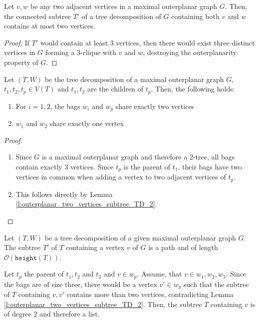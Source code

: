 \begin{lemma}\label{l:outerplanar_two_vertices_subtree_TD_2}
	Let $v,w$ be any two adjacent vertices in a maximal outerplanar graph $G$. Then, the connected subtree $T'$ of a tree decomposition of $G$ containing both $v$ and $w$ contains at most two vertices.
\end{lemma}
\begin{proof}
	If $T'$ would contain at least 3 vertices, then there would exist three distinct vertices in $G$ forming a 3-clique with $v$ and $w$, destroying the outerplanarity property of $G$.
\end{proof}

\begin{lemma}\label{l:outerplanar_TD_properties}
	Let $(T,W)$ be the tree decomposition of a maximal outerplanar graph $G$, $t_1,t_2,t_p \in V(T)$ and $t_1, t_2$ are the children of $t_p$. Then, the following holds:
	\begin{enumerate}
		\item For $i = 1,2$, the bags $w_i$ and $w_p$ share exactly two vertices
		\item $w_1$ and $w_2$ share exactly one vertex
	\end{enumerate}
\end{lemma}
\begin{proof}
	\begin{enumerate}
		\item Since $G$ is a maximal outerplanar graph and therefore a 2-tree, all bags contain exactly 3 vertices. Since $t_p$ is the parent of $t_1$, their bags have two vertices in common when adding a vertex to two adjacent vertices of $t_p$.
		\item This follows directly by Lemma \ref{l:outerplanar_two_vertices_subtree_TD_2}.
	\end{enumerate}
\end{proof}

\begin{lemma}
	Let $(T,W)$ be a tree decomposition of a given maximal outerplanar graph $G$. The subtree $T'$ of $T$ containing a vertex $v$ of $G$ is a path and of length $\mathcal{O}(\texttt{height}(T))$.\label{l:max_outerplanar_active_vertex_path}
\end{lemma}
Let $t_p$ the parent of $t_1,t_2$ and $t_3$ and $v \in w_p$. Assume, that $v \in w_1,w_2,w_3$. Since the bags are of size three, there would be a vertex $v'\in w_p$ such that the subtree of $T$ containing $v,v'$ contains more than two vertices, contradicting Lemma \ref{l:outerplanar_two_vertices_subtree_TD_2}. Then, the subtree $T$ containing $v$ is of degree 2 and therefore a list.

